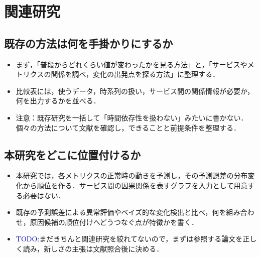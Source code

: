 \section{関連研究}
\label{sec:related}

\subsection{既存の方法は何を手掛かりにするか}
\begin{itemize}
    \item まず，「普段からどれくらい値が変わったかを見る方法」と，「サービスやメトリクスの関係を調べ，変化の出発点を探る方法」に整理する．
    \item 比較表には，使うデータ，時系列の扱い，サービス間の関係情報が必要か，何を出力するかを並べる．
    \item 注意：既存研究を一括して「時間依存性を扱わない」みたいに書かない．個々の方法について文献を確認し，できることと前提条件を整理する．
\end{itemize}

\subsection{本研究をどこに位置付けるか}
\begin{itemize}
    \item 本研究では，各メトリクスの正常時の動きを予測し，その予測誤差の分布変化から順位を作る．サービス間の因果関係を表すグラフを入力として用意する必要はない．
    \item 既存の予測誤差による異常評価やベイズ的な変化検出と比べ，何を組み合わせ，原因候補の順位付けへどうつなぐ点が特徴かを書く．
    \item \textcolor{blue}{TODO:}まだきちんと関連研究を絞れてないので，まずは参照する論文を正しく読み，新しさの主張は文献照合後に決める．
\end{itemize}

